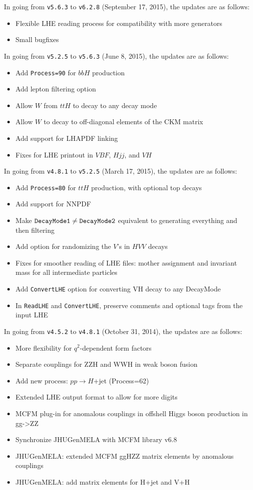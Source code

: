 \documentclass[aps,superscriptaddress,nofootinbib]{revtex4}
\begin{document}
\noindent
In going from \verb|v5.6.3| to \verb|v6.2.8| (September 17, 2015), the updates are as follows:
\begin{itemize}
\item Flexible LHE reading process for compatibility with more generators
\item Small bugfixes
\end{itemize}
\noindent
In going from \verb|v5.2.5| to \verb|v5.6.3| (June 8, 2015), the updates are as follows:
\begin{itemize}
\item Add \verb|Process=90| for $bbH$ production
\item Add lepton filtering option
\item Allow $W$ from $ttH$ to decay to any decay mode
\item Allow $W$ to decay to off-diagonal elements of the CKM matrix
\item Add support for LHAPDF linking
\item Fixes for LHE printout in $VBF$, $Hjj$, and $VH$
\end{itemize}
\noindent
In going from \verb|v4.8.1| to \verb|v5.2.5| (March 17, 2015), the updates are as follows:
\begin{itemize}
\item Add \verb|Process=80| for $ttH$ production, with optional top decays
\item Add support for NNPDF
\item Make $\verb|DecayMode1|\ne\verb|DecayMode2|$ equivalent to generating everything and then filtering
\item Add option for randomizing the $V$'s in $HVV$ decays
\item Fixes for smoother reading of LHE files: mother assignment and invariant mass for all intermediate particles
\item Add \verb|ConvertLHE| option for converting VH decay to any DecayMode
\item In \verb|ReadLHE| and \verb|ConvertLHE|, preserve comments and optional tags from the input LHE
\end{itemize}
\noindent
In going from \verb|v4.5.2| to \verb|v4.8.1| (October 31, 2014), the updates are as follows:
\begin{itemize}
\item More flexibility for $q^2$-dependent form factors
\item Separate couplings for ZZH and WWH in weak boson fusion
\item Add new process: $pp\to H$+jet (Process=62)
\item Extended LHE output format to allow for more digits
\item MCFM plug-in for anomalous couplings in offshell Higgs boson production in gg->ZZ
\item Synchronize JHUGenMELA with MCFM library v6.8
\item JHUGenMELA: extended MCFM ggHZZ matrix elements by anomalous couplings
\item JHUGenMELA: add matrix elements for H+jet and V+H
\end{itemize}
\end{document}
